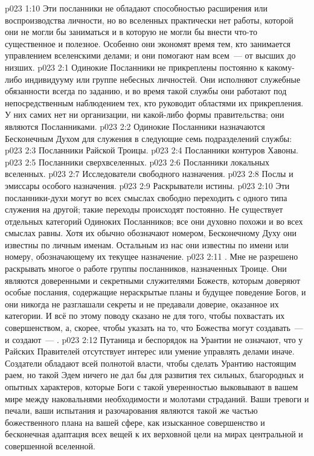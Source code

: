 \vs p023 1:10 \pc Эти посланники не обладают способностью расширения или воспроизводства личности, но во вселенных практически нет работы, которой они не могли бы заниматься и в которую не могли бы внести что\hyp{}то существенное и полезное. Особенно они экономят время тем, кто занимается управлением вселенскими делами; и они помогают нам всем~--- от высших до низших.
\vs p023 2:1 Одинокие Посланники не прикреплены постоянно к какому\hyp{}либо индивидууму или группе небесных личностей. Они исполняют служебные обязанности всегда по заданию, и во время такой службы они работают под непосредственным наблюдением тех, кто руководит областями их прикрепления. У них самих нет ни организации, ни какой\hyp{}либо формы правительства; они являются  Посланниками.
\vs p023 2:2 \pc Одинокие Посланники назначаются Бесконечным Духом для служения в следующие семь подразделений службы:
\vs p023 2:3 Посланники Райской Троицы.
\vs p023 2:4 Посланники контуров Хавоны.
\vs p023 2:5 Посланники сверхвселенных.
\vs p023 2:6 Посланники локальных вселенных.
\vs p023 2:7 Исследователи свободного назначения.
\vs p023 2:8 Послы и эмиссары особого назначения.
\vs p023 2:9 Раскрыватели истины.
\vs p023 2:10 \pc Эти посланники\hyp{}духи могут во всех смыслах свободно переходить с одного типа служения на другой; такие переходы происходят постоянно. Не существует отдельных категорий Одиноких Посланников; все они духовно похожи и во всех смыслах равны. Хотя их обычно обозначают номером, Бесконечному Духу они известны по личным именам. Остальным из нас они известны по имени или номеру, обозначающему их текущее назначение.
\vs p023 2:11 . Мне не разрешено раскрывать многое о работе группы посланников, назначенных Троице. Они являются доверенными и секретными служителями Божеств, которым доверяют особые послания, содержащие нераскрытые планы и будущее поведение Богов, и они никогда не разглашали секреты и не предавали доверие, оказанное их категории. И всё по этому поводу сказано не для того, чтобы похвастать их совершенством, а, скорее, чтобы указать на то, что Божества могут создавать~--- и создают~--- .
\vs p023 2:12 Путаница и беспорядок на Урантии не означают, что у Райских Правителей отсутствует интерес или умение управлять делами иначе. Создатели обладают всей полнотой власти, чтобы сделать Урантию настоящим раем, но такой Эдем ничего не дал бы для развития тех сильных, благородных и опытных характеров, которые Боги с такой уверенностью выковывают в вашем мире между наковальнями необходимости и молотами страданий. Ваши тревоги и печали, ваши испытания и разочарования являются такой же частью божественного плана на вашей сфере, как изысканное совершенство и бесконечная адаптация всех вещей к их верховной цели на мирах центральной и совершенной вселенной.
